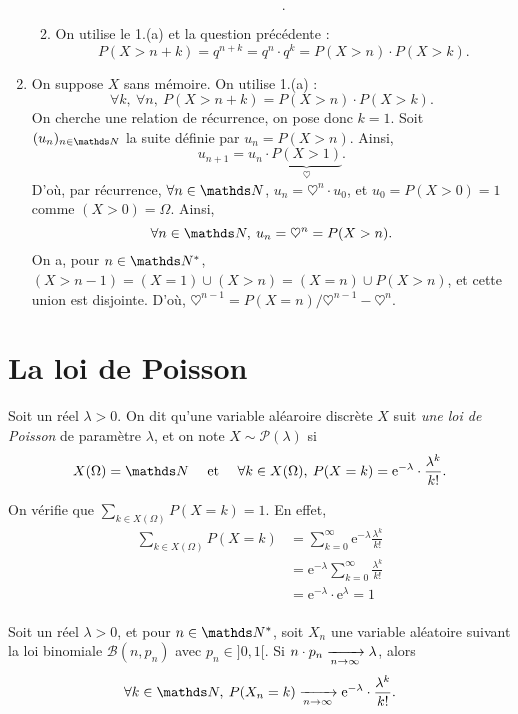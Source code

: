 \begin{exo}
\begin{enumerate}
\begin{enumerate}
\[          .\] 
        \item On utilise le 1.(a) et la question précédente :
          \[
            P(X > n + k) = q^{n + k} = q^n \cdot q^k = P(X > n) \cdot P(X > k)
          .\]
      \end{enumerate}
    \item On suppose $X$\/ sans mémoire. On utilise 1.(a) : \[
        \forall k,\: \forall n,\: P(X > n + k) = P(X > n) \cdot P(X > k)
      .\] On cherche une relation de récurrence, on pose donc $k = 1$. Soit $(u_n)_{n\in\N}$\/ la suite définie par $u_n = P(X > n)$. Ainsi, \[
        u_{n+1} = u_n \cdot \underbrace{P(X > 1)}_{\heartsuit}
      .\]
      D'où, par récurrence, $\forall n \in \N$, $u_n = \heartsuit^n \cdot u_0$, et $u_0 = P(X > 0) = 1$\/ comme $(X > 0) = \Omega$. Ainsi, \[
        \forall n \in \N,\: u_n = \heartsuit^n  = P(X > n)
      .\] On a, pour $n \in \N^*$, $(X > n - 1) = (X = 1) \cup (X > n) = (X = n) \cup P(X > n)$, et cette union est disjointe.
      D'où, $\heartsuit^{n-1} = P(X = n) / \heartsuit^{n - 1} - \heartsuit^n$.
  \end{enumerate}
\end{exo}

\section{La loi  de Poisson}

\begin{defn}
  Soit un réel $\lambda > 0$. On dit qu'une variable aléaroire discrète $X$\/ suit \textit{une loi de Poisson} de paramètre $\lambda$, et on note $X \sim \mathcal{P}(\lambda)$\/ si \[
    X(\Omega) = \N \quad \text{ et } \quad \forall k \in X(\Omega),\: P(X = k) = \mathrm{e}^{-\lambda} \cdot \frac{\lambda^k}{k!}
  .\]
\end{defn}

On vérifie que $\sum_{k \in X(\Omega)} P(X = k) = 1$. En effet,
\begin{align*}
  \sum_{k \in X(\Omega)} P(X = k) &= \sum_{k=0}^\infty \mathrm{e}^{-\lambda} \frac{\lambda^k}{k!} \\
  &= \mathrm{e}^{-\lambda} \sum_{k=0}^\infty \frac{\lambda^k}{k!} \\
  &= \mathrm{e}^{-\lambda} \cdot \mathrm{e}^\lambda = 1 \\
\end{align*}

\begin{prop}
  Soit un réel $\lambda > 0$, et pour $n \in \N^*$, soit $X_n$\/ une variable aléatoire suivant la loi binomiale $\mathcal{B}(n, p_n)$\/ avec $p_n \in {]0,1[}$. Si $n \cdot p_n \xrightarrow[n\to \infty]{} \lambda$, alors \[
    \forall k \in \N,\: P(X_n = k) \tendsto{n\to \infty} \mathrm{e}^{-\lambda} \cdot \frac{\lambda^k}{k!}
  .\]
\end{prop}

